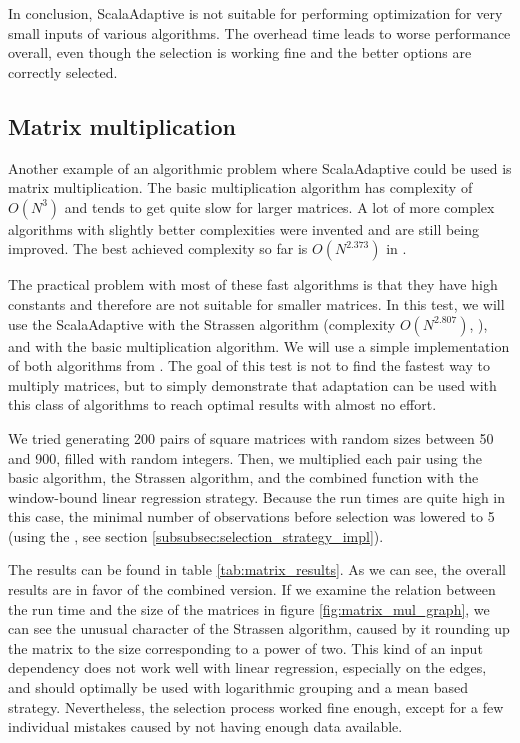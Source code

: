 In conclusion, ScalaAdaptive is not suitable for performing optimization for very small inputs of various algorithms. The overhead time leads to worse performance overall, even though the selection is working fine and the better options are correctly selected.

\subsection{Matrix multiplication}

Another example of an algorithmic problem where ScalaAdaptive could be used is matrix multiplication. The basic multiplication algorithm has complexity of $O(N^3)$ and tends to get quite slow for larger matrices. A lot of more complex algorithms with slightly better complexities were invented and are still being improved. The best achieved complexity so far is $O(N^{2.373})$ in \cite{williams_multiplying_2012}.

The practical problem with most of these fast algorithms is that they have high constants and therefore are not suitable for smaller matrices. In this test, we will use the ScalaAdaptive with the Strassen algorithm (complexity $O(N^{2.807})$, \cite{strassen_gaussian_1969}), and with the basic multiplication algorithm. We will use a simple implementation of both algorithms from \cite{noauthor_jlinalg_nodate}. The goal of this test is not to find the fastest way to multiply matrices, but to simply demonstrate that adaptation can be used with this class of algorithms to reach optimal results with almost no effort.

We tried generating 200 pairs of square matrices with random sizes between 50 and 900, filled with random integers. Then, we multiplied each pair using the basic algorithm, the Strassen algorithm, and the combined function with the window-bound linear regression strategy. Because the run times are quite high in this case, the minimal number of observations before selection was lowered to 5 (using the , see section \ref{subsubsec:selection_strategy_impl}). 

The results can be found in table \ref{tab:matrix_results}. As we can see, the overall results are in favor of the combined version. If we examine the relation between the run time and the size of the matrices in figure \ref{fig:matrix_mul_graph}, we can see the unusual character of the Strassen algorithm, caused by it rounding up the matrix to the size corresponding to a power of two. This kind of an input dependency does not work well with linear regression, especially on the edges, and should optimally be used with logarithmic grouping and a mean based strategy. Nevertheless, the selection process worked fine enough, except for a few individual mistakes caused by not having enough data available.

